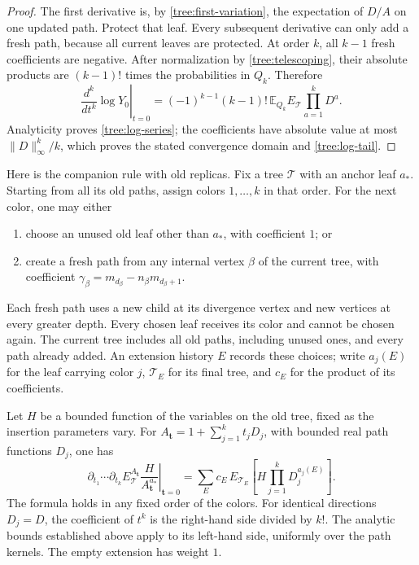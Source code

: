 \begin{proof}
The first derivative is, by
\eqref{tree:first-variation}, the expectation of $D/A$ on one updated
path.  Protect that leaf.  Every subsequent derivative can only add
a fresh path, because all current leaves are protected.  At order
$k$, all $k-1$ fresh coefficients are negative.  After normalization
by \eqref{tree:telescoping}, their absolute products are
$(k-1)!$ times the probabilities in $Q_k$.  Therefore
\[
  \left.\frac{d^k}{dt^k}\log Y_0\right|_{t=0}
    =(-1)^{k-1}(k-1)!\,
       \mathbb E_{Q_k}E_{\mathcal T}\prod_{a=1}^kD^a.
\]
Analyticity proves \eqref{tree:log-series}; the coefficients have
absolute value at most $\|D\|_\infty^k/k$, which proves the stated
convergence domain and \eqref{tree:log-tail}.
\end{proof}

Here is the companion rule with old replicas.  Fix a tree
$\mathcal T$ with an anchor leaf $a_*$.  Starting from all its old
paths, assign colors $1,\ldots,k$ in that order.  For the next color,
one may either
\begin{enumerate}[label=(\roman*),nosep]
  \item choose an unused old leaf other than $a_*$, with coefficient
  $1$; or
  \item create a fresh path from any internal vertex $\beta$ of the
  current tree, with coefficient
  $\gamma_\beta=m_{d_\beta}-n_\beta m_{d_\beta+1}$.
\end{enumerate}
Each fresh path uses a new child at its divergence vertex and new
vertices at every greater depth.  Every chosen leaf receives its color
and cannot be chosen again.  The current tree includes all old paths,
including unused ones, and every path already added.  An extension
history $E$ records these choices; write $a_j(E)$ for the leaf carrying
color $j$, $\mathcal T_E$ for its final tree, and $c_E$ for the product
of its coefficients.

\begin{lemma}\label{tree:extension-expansion}
Let $H$ be a bounded function of the variables on the old tree, fixed
as the insertion parameters vary.  For
$A_{\boldsymbol t}=1+\sum_{j=1}^k t_jD_j$, with bounded real path
functions $D_j$, one has
\begin{equation}\label{tree:mixed-expansion}
  \left.\partial_{t_1}\cdots\partial_{t_k}
       E_{\mathcal T}^{A_{\boldsymbol t}}
        \frac{H}{A_{\boldsymbol t}^{a_*}}
  \right|_{\boldsymbol t=0}
   =\sum_E c_E\,
       E_{\mathcal T_E}
          \left[H\prod_{j=1}^kD_j^{a_j(E)}\right].
\end{equation}
The formula holds in any fixed order of the colors.  For identical
directions $D_j=D$, the coefficient of $t^k$ is the right-hand side
divided by $k!$.  The analytic bounds established above apply to its
left-hand side, uniformly over the path kernels.  The empty extension has weight $1$.
\end{lemma}

